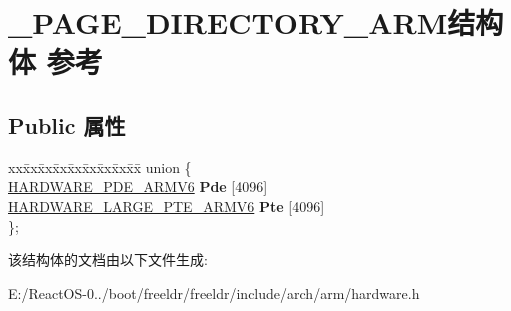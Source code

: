 \hypertarget{struct___p_a_g_e___d_i_r_e_c_t_o_r_y___a_r_m}{}\section{\+\_\+\+P\+A\+G\+E\+\_\+\+D\+I\+R\+E\+C\+T\+O\+R\+Y\+\_\+\+A\+R\+M结构体 参考}
\label{struct___p_a_g_e___d_i_r_e_c_t_o_r_y___a_r_m}
\subsection*{Public 属性}
\begin{DoxyCompactItemize}
\item 
\mbox{\label{struct___p_a_g_e___d_i_r_e_c_t_o_r_y___a_r_m_a8b7c0c6353498349db24e5df38a0d627}} 
\begin{tabbing}
xx\=xx\=xx\=xx\=xx\=xx\=xx\=xx\=xx\=\kill
union \{\\
\>\hyperlink{struct___h_a_r_d_w_a_r_e___p_d_e___a_r_m_v6}{HARDWARE\_PDE\_ARMV6} {\bfseries Pde} \mbox{[}4096\mbox{]}\\
\>\hyperlink{struct___h_a_r_d_w_a_r_e___l_a_r_g_e___p_t_e___a_r_m_v6}{HARDWARE\_LARGE\_PTE\_ARMV6} {\bfseries Pte} \mbox{[}4096\mbox{]}\\
\}; \\

\end{tabbing}\end{DoxyCompactItemize}


该结构体的文档由以下文件生成\+:\begin{DoxyCompactItemize}
\item 
E\+:/\+React\+O\+S-\/0../boot/freeldr/freeldr/include/arch/arm/hardware.\+h\end{DoxyCompactItemize}
